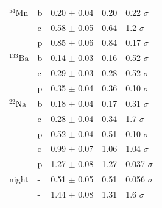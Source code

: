 \begin{multicolfloat}
\begin{center}
\begin{adjustbox}{max width=\linewidth, keepaspectratio}
\begin{tabular}{lllll}
            $^{54}\text{Mn}$  & b    & 0.20 $\pm$ 0.04                              & 0.20                                          & 0.22  $\sigma$ \\
            ~                 & c    & 0.58 $\pm$ 0.05                              & 0.64                                          & 1.2   $\sigma$ \\
            ~                 & p    & 0.85 $\pm$ 0.06                              & 0.84                                          & 0.17  $\sigma$ \\
            $^{133}\text{Ba}$ & b    & 0.14 $\pm$ 0.03                              & 0.16                                          & 0.52  $\sigma$ \\
            ~                 & c    & 0.29 $\pm$ 0.03                              & 0.28                                          & 0.52  $\sigma$ \\
            ~                 & p    & 0.35 $\pm$ 0.04                              & 0.36                                          & 0.10  $\sigma$ \\
            $^{22}\text{Na}$  & b    & 0.18 $\pm$ 0.04                              & 0.17                                          & 0.31  $\sigma$ \\
            ~                 & c    & 0.28 $\pm$ 0.04                              & 0.34                                          & 1.7   $\sigma$ \\
            ~                 & p    & 0.52 $\pm$ 0.04                              & 0.51                                          & 0.10  $\sigma$ \\
            ~                 & c    & 0.99 $\pm$ 0.07                              & 1.06                                          & 1.04  $\sigma$ \\
            ~                 & p    & 1.27 $\pm$ 0.08                              & 1.27                                          & 0.037 $\sigma$ \\
            night             & -    & 0.51 $\pm$ 0.05                              & 0.51                                          & 0.056 $\sigma$ \\
            ~                 & -    & 1.44 $\pm$ 0.08                              & 1.31                                          & 1.6   $\sigma$ \\
            \bottomrule
            \end{tabular}
        \end{adjustbox}
        \label{tab:EnergyComparison}
    \end{center}
\end{multicolfloat}
%
